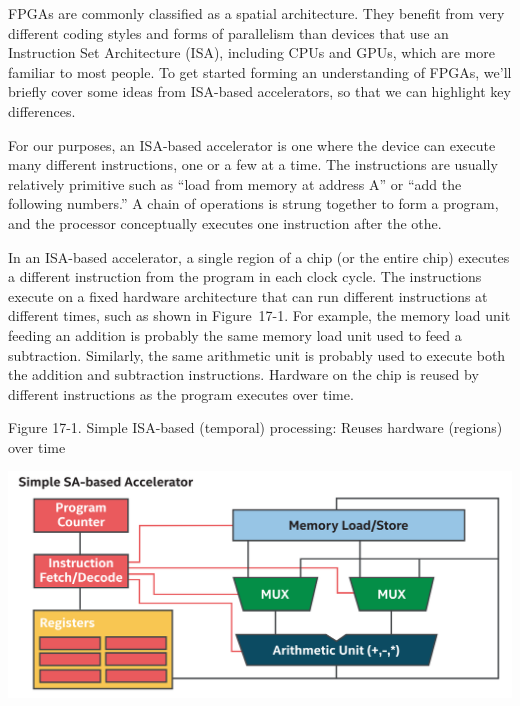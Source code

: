 FPGAs are commonly classified as a spatial architecture. They benefit from very different coding styles and forms of parallelism than devices that use an Instruction Set Architecture (ISA), including CPUs and GPUs, which are more familiar to most people. To get started forming an understanding of FPGAs, we’ll briefly cover some ideas from ISA-based accelerators, so that we can highlight key differences.\par

For our purposes, an ISA-based accelerator is one where the device can execute many different instructions, one or a few at a time. The instructions are usually relatively primitive such as “load from memory at address A” or “add the following numbers.” A chain of operations is strung together to form a program, and the processor conceptually executes one instruction after the othe.\par

In an ISA-based accelerator, a single region of a chip (or the entire chip) executes a different instruction from the program in each clock cycle. The instructions execute on a fixed hardware architecture that can run different instructions at different times, such as shown in Figure 17-1. For example, the memory load unit feeding an addition is probably the same memory load unit used to feed a subtraction. Similarly, the same arithmetic unit is probably used to execute both the addition and subtraction instructions. Hardware on the chip is reused by different instructions as the program executes over time.\par

\hspace*{\fill} \par %
Figure 17-1. Simple ISA-based (temporal) processing: Reuses hardware (regions) over time
\begin{center}
	\includegraphics[width=1.0\textwidth]{content/chapter-17/images/2}
\end{center}

